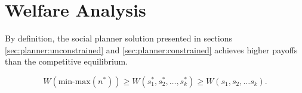 \documentclass[../../main.tex]{subfiles}
\begin{document}
\section{Welfare Analysis}

By definition, the social planner solution presented in sections \ref{sec:planner:unconstrained} and \ref{sec:planner:constrained} achieves higher payoffs than the competitive equilibrium.

\begin{equation}
    W(\text{min-max}(n^*)) \geq W(s^*_1, s^*_2, \ldots, s^*_k) \geq W(s_1, s_2, \ldots s_k). 
\end{equation}

\end{document}

